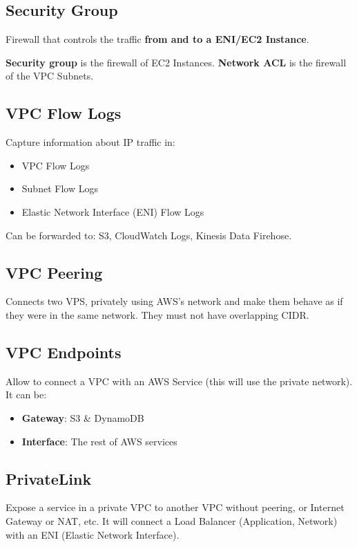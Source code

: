 \subsection{Security Group}\label{subsec:security-group}
Firewall that controls the traffic \textbf{from and to a ENI/EC2 Instance}\@.

\begin{tcolorbox}[enhanced, sharp corners, colback=yellow!20]
    \textbf{Security group} is the firewall of EC2 Instances.\newline
    \textbf{Network ACL} is the firewall of the VPC Subnets.
\end{tcolorbox}

\subsection{VPC Flow Logs}\label{subsec:vpc-flow-logs}
Capture information about IP traffic in:

\begin{itemize}
    \item{VPC Flow Logs}
    \item{Subnet Flow Logs}
    \item{Elastic Network Interface (ENI) Flow Logs}
\end{itemize}

Can be forwarded to: S3, CloudWatch Logs, Kinesis Data Firehose.

\subsection{VPC Peering}\label{subsec:vpc-peering}
Connects two VPS, privately using AWS's network and make them behave as if they were in the same network.
They must not have overlapping CIDR\@.

\subsection{VPC Endpoints}\label{subsec:vpc-endpoints}
Allow to connect a VPC with an AWS Service (this will use the private network).
It can be:

\begin{itemize}
    \item{\textbf{Gateway}: S3 \@\& DynamoDB}
    \item{\textbf{Interface}: The rest of AWS services}
\end{itemize}

\subsection{PrivateLink}\label{subsec:privatelink}
Expose a service in a private VPC to another VPC without peering, or Internet Gateway or NAT, etc\@.
It will connect a Load Balancer (Application, Network) with an ENI (Elastic Network Interface).

